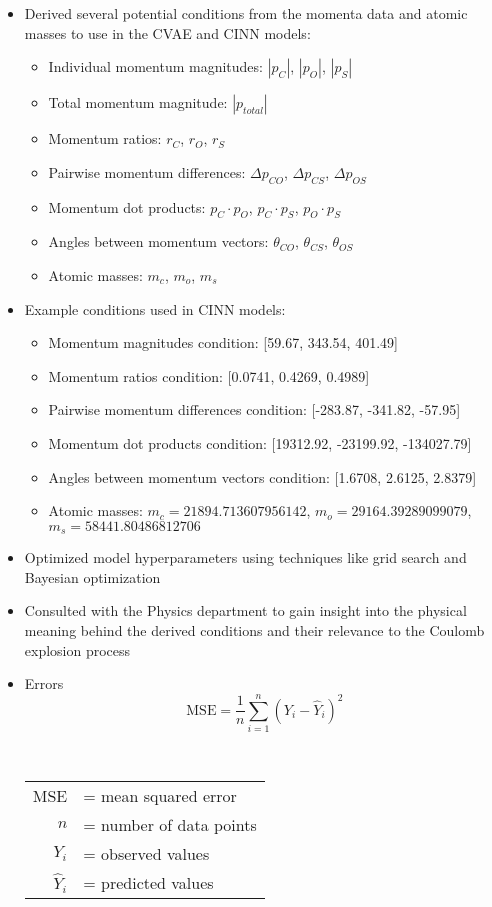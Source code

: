 \documentclass{article}
\begin{document}
\begin{itemize}
        
    \item Derived several potential conditions from the momenta data and atomic masses to use in the CVAE and CINN models:
    \begin{itemize}[label={-}]
        \item Individual momentum magnitudes: $|p_C|$, $|p_O|$, $|p_S|$
        \item Total momentum magnitude: $|p_{total}|$
        \item Momentum ratios: $r_C$, $r_O$, $r_S$
        \item Pairwise momentum differences: $\Delta p_{CO}$, $\Delta p_{CS}$, $\Delta p_{OS}$
        \item Momentum dot products: $p_C \cdot p_O$, $p_C \cdot p_S$, $p_O \cdot p_S$
        \item Angles between momentum vectors: $\theta_{CO}$, $\theta_{CS}$, $\theta_{OS}$
        \item Atomic masses: $m_c$, $m_o$, $m_s$
    \end{itemize}
    \item Example conditions used in CINN models:
    \begin{itemize}[label={-}]
        \item Momentum magnitudes condition: [59.67, 343.54, 401.49]
        \item Momentum ratios condition: [0.0741, 0.4269, 0.4989]
        \item Pairwise momentum differences condition: [-283.87, -341.82, -57.95]
        \item Momentum dot products condition: [19312.92, -23199.92, -134027.79]
        \item Angles between momentum vectors condition: [1.6708, 2.6125, 2.8379]
        \item Atomic masses: $m_c = 21894.713607956142$, $m_o = 29164.39289099079$, $m_s = 58441.80486812706$
    \end{itemize}
    \item Optimized model hyperparameters using techniques like grid search and Bayesian optimization
    \item Consulted with the Physics department to gain insight into the physical meaning behind the derived conditions and their relevance to the Coulomb explosion process
\item Errors
\begin{equation}
    \text{MSE} = \frac{1}{n} \sum_{i=1}^{n} (Y_i - \hat{Y}_i)^2
    \label{eq:mse}
\end{equation}
\begin{flushleft}
\\[0.5em]
\begin{tabular}{@{}r@{\ }l@{}}
    MSE & = mean squared error \\
    $n$ & = number of data points \\
    $Y_i$ & = observed values \\
    $\hat{Y}_i$ & = predicted values
\end{tabular}
\end{flushleft}


\end{itemize}
\end{document}
